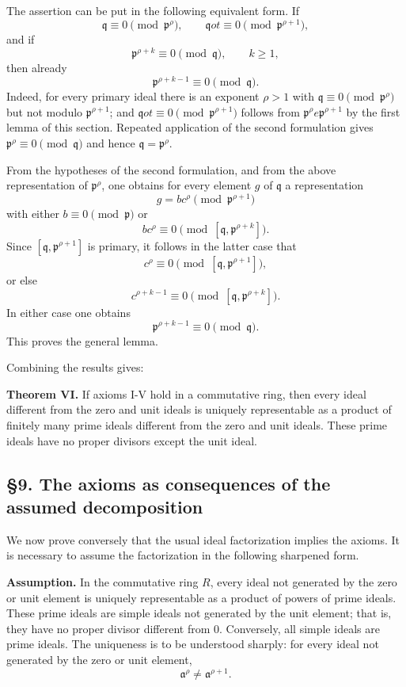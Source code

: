 \documentclass[11pt]{article}
\begin{document}
The assertion can be put in the following equivalent form. If \[
  \mathfrak q\equiv0\pmod{\mathfrak p^{\rho}},
  \qquad \mathfrak q
ot\equiv0\pmod{\mathfrak p^{\rho+1}},
\] and if \[
  \mathfrak p^{\rho+k}\equiv0\pmod{\mathfrak q},\qquad k\ge1,
\] then already \[
  \mathfrak p^{\rho+k-1}\equiv0\pmod{\mathfrak q}.
\] Indeed, for every primary ideal there is an exponent \(\rho>1\) with
\(\mathfrak q\equiv0\pmod{\mathfrak p^{\rho}}\) but not modulo
\(\mathfrak p^{\rho+1}\); and \(\mathfrak q
ot\equiv0\pmod{\mathfrak p^{\rho+1}}\) follows from \(\mathfrak p^{\rho}
e\mathfrak p^{\rho+1}\) by the first lemma of this section. Repeated
application of the second formulation gives
\(\mathfrak p^{\rho}\equiv0\pmod{\mathfrak q}\) and hence
\(\mathfrak q=\mathfrak p^{\rho}\).

From the hypotheses of the second formulation, and from the above
representation of \(\mathfrak p^{\rho}\), one obtains for every element
\(g\) of \(\mathfrak q\) a representation \[
  g=b c^{\rho} \pmod{\mathfrak p^{\rho+1}}
\] with either \(b\equiv0\pmod{\mathfrak p}\) or \[
  b c^{\rho}\equiv0\pmod{[\mathfrak q,\mathfrak p^{\rho+k}]}.
\] Since \([\mathfrak q,\mathfrak p^{\rho+1}]\) is primary, it follows
in the latter case that \[
  c^{\rho}\equiv0\pmod{[\mathfrak q,\mathfrak p^{\rho+1}]},
\] or else \[
  c^{\rho+k-1}\equiv0\pmod{[\mathfrak q,\mathfrak p^{\rho+k}]}.
\] In either case one obtains \[
  \mathfrak p^{\rho+k-1}\equiv0\pmod{\mathfrak q}.
\] This proves the general lemma.

Combining the results gives:

\textbf{Theorem VI.} If axioms I-V hold in a commutative ring, then
every ideal different from the zero and unit ideals is uniquely
representable as a product of finitely many prime ideals different from
the zero and unit ideals. These prime ideals have no proper divisors
except the unit ideal.

\subsection{§9. The axioms as consequences of the assumed
decomposition}\label{the-axioms-as-consequences-of-the-assumed-decomposition}

We now prove conversely that the usual ideal factorization implies the
axioms. It is necessary to assume the factorization in the following
sharpened form.

\textbf{Assumption.} In the commutative ring \(R\), every ideal not
generated by the zero or unit element is uniquely representable as a
product of powers of prime ideals. These prime ideals are simple ideals
not generated by the unit element; that is, they have no proper divisor
different from \(0\). Conversely, all simple ideals are prime ideals.
The uniqueness is to be understood sharply: for every ideal not
generated by the zero or unit element, \[
  \mathfrak a^{\rho}\ne\mathfrak a^{\rho+1}.
\]
\end{document}
